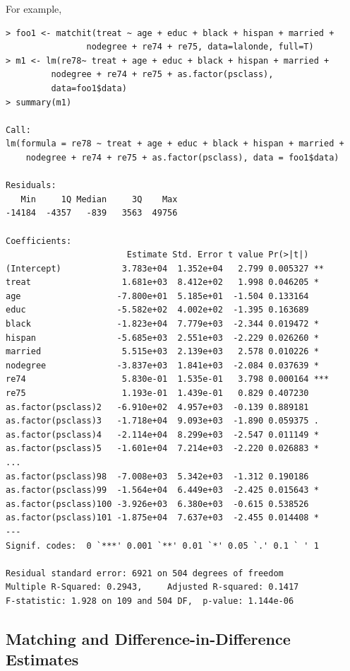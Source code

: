 \documentclass[oneside,letterpaper,titlepage]{article}
\begin{document}
For example, 

\begin{verbatim}
> foo1 <- matchit(treat ~ age + educ + black + hispan + married +
                nodegree + re74 + re75, data=lalonde, full=T)
> m1 <- lm(re78~ treat + age + educ + black + hispan + married +
         nodegree + re74 + re75 + as.factor(psclass),
         data=foo1$data)
> summary(m1)

Call:
lm(formula = re78 ~ treat + age + educ + black + hispan + married + 
    nodegree + re74 + re75 + as.factor(psclass), data = foo1$data)

Residuals:
   Min     1Q Median     3Q    Max 
-14184  -4357   -839   3563  49756 

Coefficients:
                        Estimate Std. Error t value Pr(>|t|)    
(Intercept)            3.783e+04  1.352e+04   2.799 0.005327 ** 
treat                  1.681e+03  8.412e+02   1.998 0.046205 *  
age                   -7.800e+01  5.185e+01  -1.504 0.133164    
educ                  -5.582e+02  4.002e+02  -1.395 0.163689    
black                 -1.823e+04  7.779e+03  -2.344 0.019472 *  
hispan                -5.685e+03  2.551e+03  -2.229 0.026260 *  
married                5.515e+03  2.139e+03   2.578 0.010226 *  
nodegree              -3.837e+03  1.841e+03  -2.084 0.037639 *  
re74                   5.830e-01  1.535e-01   3.798 0.000164 ***
re75                   1.193e-01  1.439e-01   0.829 0.407230    
as.factor(psclass)2   -6.910e+02  4.957e+03  -0.139 0.889181    
as.factor(psclass)3   -1.718e+04  9.093e+03  -1.890 0.059375 .  
as.factor(psclass)4   -2.114e+04  8.299e+03  -2.547 0.011149 *  
as.factor(psclass)5   -1.601e+04  7.214e+03  -2.220 0.026883 *  
...
as.factor(psclass)98  -7.008e+03  5.342e+03  -1.312 0.190186    
as.factor(psclass)99  -1.564e+04  6.449e+03  -2.425 0.015643 *  
as.factor(psclass)100 -3.926e+03  6.380e+03  -0.615 0.538526    
as.factor(psclass)101 -1.875e+04  7.637e+03  -2.455 0.014408 *  
---
Signif. codes:  0 `***' 0.001 `**' 0.01 `*' 0.05 `.' 0.1 ` ' 1 

Residual standard error: 6921 on 504 degrees of freedom
Multiple R-Squared: 0.2943,     Adjusted R-squared: 0.1417 
F-statistic: 1.928 on 109 and 504 DF,  p-value: 1.144e-06 
\end{verbatim} 

\subsection{Matching and Difference-in-Difference Estimates}
\end{document}
